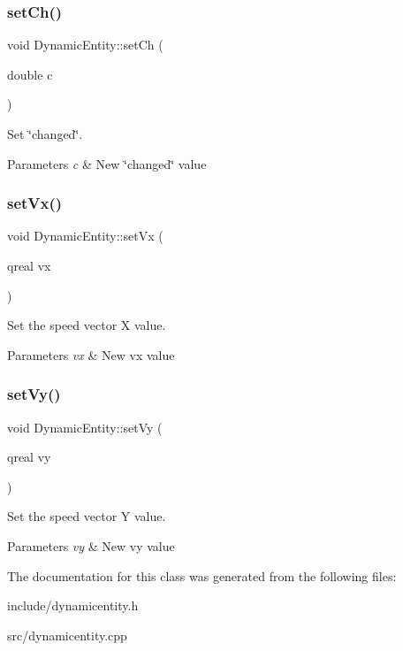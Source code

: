 \subsubsection{\texorpdfstring{set\+Ch()}{setCh()}}
{\footnotesize\ttfamily void Dynamic\+Entity\+::set\+Ch (\begin{DoxyParamCaption}\item[{double}]{c }\end{DoxyParamCaption})}



Set \char`\"{}changed\char`\"{}. 


\begin{DoxyParams}{Parameters}
{\em c} & New \char`\"{}changed\char`\"{} value \\
\hline
\end{DoxyParams}
\mbox{\label{class_dynamic_entity_a6bc80eeb1cd3d329233eb9582a99fea4}} 
\subsubsection{\texorpdfstring{set\+Vx()}{setVx()}}
{\footnotesize\ttfamily void Dynamic\+Entity\+::set\+Vx (\begin{DoxyParamCaption}\item[{qreal}]{vx }\end{DoxyParamCaption})}



Set the speed vector X value. 


\begin{DoxyParams}{Parameters}
{\em vx} & New vx value \\
\hline
\end{DoxyParams}
\mbox{\label{class_dynamic_entity_a8b4604ccca578bc4a20a18333b498c0a}} 
\subsubsection{\texorpdfstring{set\+Vy()}{setVy()}}
{\footnotesize\ttfamily void Dynamic\+Entity\+::set\+Vy (\begin{DoxyParamCaption}\item[{qreal}]{vy }\end{DoxyParamCaption})}



Set the speed vector Y value. 


\begin{DoxyParams}{Parameters}
{\em vy} & New vy value \\
\hline
\end{DoxyParams}


The documentation for this class was generated from the following files\+:\begin{DoxyCompactItemize}
\item 
include/dynamicentity.\+h\item 
src/dynamicentity.\+cpp\end{DoxyCompactItemize}
